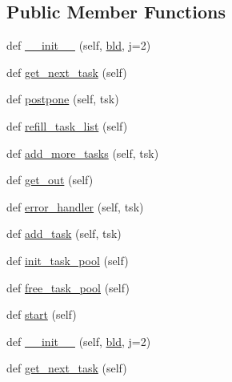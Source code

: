 \subsection*{Public Member Functions}
\begin{DoxyCompactItemize}
\item 
def \hyperlink{classwaflib_1_1_runner_1_1_parallel_a0c0a52852b556178d86233e354383f51}{\+\_\+\+\_\+init\+\_\+\+\_\+} (self, \hyperlink{classwaflib_1_1_runner_1_1_parallel_a710f2069db915f1b04538ed7989511ff}{bld}, j=2)
\item 
def \hyperlink{classwaflib_1_1_runner_1_1_parallel_a13620afd7fb0dac47215c1a434c3a79a}{get\+\_\+next\+\_\+task} (self)
\item 
def \hyperlink{classwaflib_1_1_runner_1_1_parallel_ab025fd073c2f52e72df1a3bc8d188d0e}{postpone} (self, tsk)
\item 
def \hyperlink{classwaflib_1_1_runner_1_1_parallel_a2f7785b4be91f45b53a9f294fb3a990e}{refill\+\_\+task\+\_\+list} (self)
\item 
def \hyperlink{classwaflib_1_1_runner_1_1_parallel_a7501769205be6d24343c054f46e43289}{add\+\_\+more\+\_\+tasks} (self, tsk)
\item 
def \hyperlink{classwaflib_1_1_runner_1_1_parallel_aa5803cc70ce58b6f1ed09d8e4414aeef}{get\+\_\+out} (self)
\item 
def \hyperlink{classwaflib_1_1_runner_1_1_parallel_a5687053d52ada326ac8754dc15bd5138}{error\+\_\+handler} (self, tsk)
\item 
def \hyperlink{classwaflib_1_1_runner_1_1_parallel_a7b6dec41418a4eb5a39aa35756ef39c6}{add\+\_\+task} (self, tsk)
\item 
def \hyperlink{classwaflib_1_1_runner_1_1_parallel_a847fede29cb9dfe31b6b694e1044d100}{init\+\_\+task\+\_\+pool} (self)
\item 
def \hyperlink{classwaflib_1_1_runner_1_1_parallel_aed9785fdb3b1d54bbdc5520942ebe237}{free\+\_\+task\+\_\+pool} (self)
\item 
def \hyperlink{classwaflib_1_1_runner_1_1_parallel_a091adebadfabd759640c7347de4b05e2}{start} (self)
\item 
def \hyperlink{classwaflib_1_1_runner_1_1_parallel_a0c0a52852b556178d86233e354383f51}{\+\_\+\+\_\+init\+\_\+\+\_\+} (self, \hyperlink{classwaflib_1_1_runner_1_1_parallel_a710f2069db915f1b04538ed7989511ff}{bld}, j=2)
\item 
def \hyperlink{classwaflib_1_1_runner_1_1_parallel_a13620afd7fb0dac47215c1a434c3a79a}{get\+\_\+next\+\_\+task} (self)
\item 

\end{DoxyCompactItemize}
